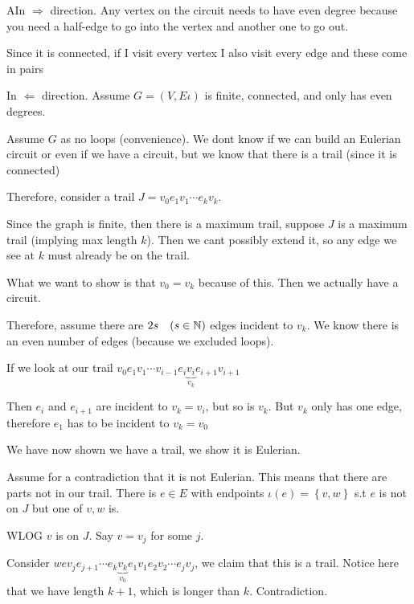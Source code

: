 \begin{prf}
  AIn $\Rightarrow$ direction. Any vertex on the circuit needs to have even degree because you need a half-edge to go into the vertex and another one to go out.\par
  \noindent Since it is connected, if I visit every vertex I also visit every edge and these come in pairs
  \par\bigskip
  \noindent In $\Leftarrow$ direction. Assume $G = (V,E\iota)$ is finite, connected, and only has even degrees.\par
  \noindent Assume $G$ as no loops (convenience). We dont know if we can build an Eulerian circuit or even if we have a circuit, but we know that there is a trail (since it is connected)\par
  \noindent Therefore, consider a trail $J = v_0e_1v_1\cdots e_kv_k$. \par
  \noindent Since the graph is finite, then there is a maximum trail, suppose $J$ is a maximum trail (implying max length $k$). Then we cant possibly extend it, so any edge we see at $k$ must already be on the trail.\par
  \noindent What we want to show is that $v_0=v_k$ because of this. Then we actually have a circuit.\par
  \noindent Therefore, assume there are $2s\quad (s\in\mathbb{N})$ edges incident to $v_k$. We know there is an even number of edges (because we excluded loops).\par
  \noindent If we look at our trail $v_0e_1v_1\cdots v_{i-1}e_i\underbrace{v_i}_{\text{$v_k$}}e_{i+1}v_{i+1}$\par
  \noindent Then $e_i$ and $e_{i+1}$ are incident to $v_k=v_i$, but so is $v_k$. But $v_k$ only has one edge, therefore $e_1$ has to be incident to $v_k=v_0$\par
  \noindent We have now shown we have a trail, we show it is Eulerian.\par
  \noindent Assume for a contradiction that it is not Eulerian. This means that there are parts not in our trail. There is $e\in E$ with endpoints $\iota(e) = \left\{v,w\right\}$ s.t $e$ is not on $J$ but one of $v,w$ is.\par
  \noindent WLOG $v$ is on $J$. Say $v = v_j$ for some $j$.\par
  \noindent Consider $wev_je_{j+1}\cdots e_k\underbrace{v_k}_{\text{$v_0$}}e_1v_1e_2v_2\cdots e_jv_j$, we claim that this is a trail. Notice here that we have length $k+1$, which is longer than $k$. Contradiction.
\end{prf}

